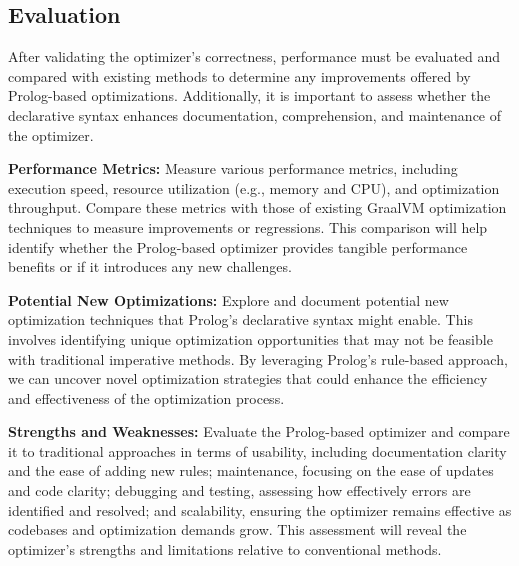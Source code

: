 \subsection{Evaluation}
After validating the optimizer's correctness, performance must be evaluated and compared with existing methods to determine any improvements offered by Prolog-based optimizations. Additionally, it is important to assess whether the declarative syntax enhances documentation, comprehension, and maintenance of the optimizer.
\begin{compactitem}
    \item \textbf{Performance Metrics:} Measure various performance metrics, including execution speed, resource utilization (e.g., memory and CPU), and optimization throughput. Compare these metrics with those of existing GraalVM optimization techniques to measure improvements or regressions. This comparison will help identify whether the Prolog-based optimizer provides tangible performance benefits or if it introduces any new challenges.
    \item \textbf{Potential New Optimizations:} Explore and document potential new optimization techniques that Prolog's declarative syntax might enable. This involves identifying unique optimization opportunities that may not be feasible with traditional imperative methods. By leveraging Prolog’s rule-based approach, we can uncover novel optimization strategies that could enhance the efficiency and effectiveness of the optimization process.
    \item \textbf{Strengths and Weaknesses:} Evaluate the Prolog-based optimizer and compare it to traditional approaches in terms of usability, including documentation clarity and the ease of adding new rules; maintenance, focusing on the ease of updates and code clarity; debugging and testing, assessing how effectively errors are identified and resolved; and scalability, ensuring the optimizer remains effective as codebases and optimization demands grow. This assessment will reveal the optimizer’s strengths and limitations relative to conventional methods.
\end{compactitem}

\newpage


